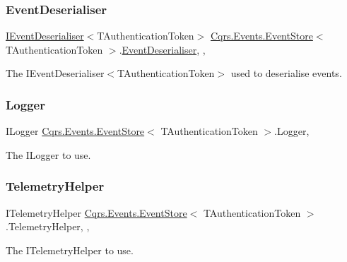 \subsubsection{\texorpdfstring{Event\+Deserialiser}{EventDeserialiser}}
{\footnotesize\ttfamily \hyperlink{interfaceCqrs_1_1Events_1_1IEventDeserialiser}{I\+Event\+Deserialiser}$<$T\+Authentication\+Token$>$ \hyperlink{classCqrs_1_1Events_1_1EventStore}{Cqrs.\+Events.\+Event\+Store}$<$ T\+Authentication\+Token $>$.\hyperlink{classCqrs_1_1Events_1_1EventDeserialiser}{Event\+Deserialiser}\hspace{0.3cm}{\ttfamily [get]}, {\ttfamily [set]}, {\ttfamily [protected]}}



The I\+Event\+Deserialiser$<$\+T\+Authentication\+Token$>$ used to deserialise events. 

\mbox{\label{classCqrs_1_1Events_1_1EventStore_a99506f7136a658364f8b74ef6a779a3f_a99506f7136a658364f8b74ef6a779a3f}} 
\subsubsection{\texorpdfstring{Logger}{Logger}}
{\footnotesize\ttfamily I\+Logger \hyperlink{classCqrs_1_1Events_1_1EventStore}{Cqrs.\+Events.\+Event\+Store}$<$ T\+Authentication\+Token $>$.Logger\hspace{0.3cm}{\ttfamily [get]}, {\ttfamily [protected]}}



The I\+Logger to use. 

\mbox{\label{classCqrs_1_1Events_1_1EventStore_a75d6d3ad3a26fb9b511e2a98e72260f9_a75d6d3ad3a26fb9b511e2a98e72260f9}} 
\subsubsection{\texorpdfstring{Telemetry\+Helper}{TelemetryHelper}}
{\footnotesize\ttfamily I\+Telemetry\+Helper \hyperlink{classCqrs_1_1Events_1_1EventStore}{Cqrs.\+Events.\+Event\+Store}$<$ T\+Authentication\+Token $>$.Telemetry\+Helper\hspace{0.3cm}{\ttfamily [get]}, {\ttfamily [set]}, {\ttfamily [protected]}}



The I\+Telemetry\+Helper to use. 

